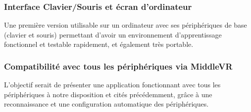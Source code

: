 \subsubsection{Interface Clavier/Souris et écran d'ordinateur}
Une première version utilisable sur un ordinateur avec ses périphériques de base (clavier et souris) permettant d'avoir un environnement d'apprentissage fonctionnel et testable rapidement, et également très portable.

\subsubsection{Compatibilité avec tous les périphériques via MiddleVR}
L'objectif serait de présenter une application fonctionnant avec tous les périphériques à notre disposition et cités précédemment, grâce à une reconnaissance et une configuration automatique des périphériques.
\\
